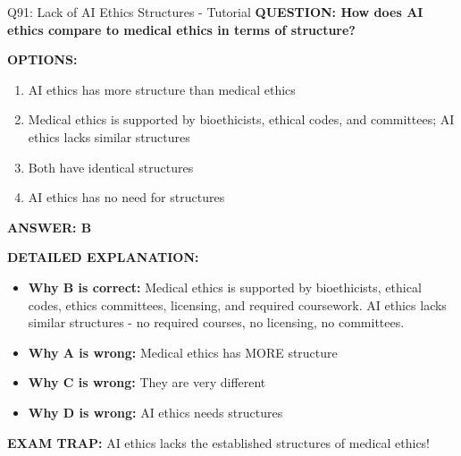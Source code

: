 \documentclass[8pt]{beamer}
\begin{document}
	\begin{frame}{Q91: Lack of AI Ethics Structures - Tutorial}
		\fontsize{6.5}{7.5}\selectfont
		\textbf{QUESTION: How does AI ethics compare to medical ethics in terms of structure?}
		
		\vspace{0.1cm}
		\textbf{OPTIONS:}
		\begin{enumerate}
			\item AI ethics has more structure than medical ethics
			\item Medical ethics is supported by bioethicists, ethical codes, and committees; AI ethics lacks similar structures
			\item Both have identical structures
			\item AI ethics has no need for structures
		\end{enumerate}
		
		\vspace{0.1cm}
		\textcolor{myblue}{\textbf{ANSWER: B}}
		
		\vspace{0.1cm}
		\textbf{DETAILED EXPLANATION:}
		\begin{itemize}
			\item \textbf{Why B is correct:} Medical ethics is supported by bioethicists, ethical codes, ethics committees, licensing, and required coursework. AI ethics lacks similar structures - no required courses, no licensing, no committees.
			\item \textbf{Why A is wrong:} Medical ethics has MORE structure
			\item \textbf{Why C is wrong:} They are very different
			\item \textbf{Why D is wrong:} AI ethics needs structures
		\end{itemize}
		
		\textcolor{myred}{\textbf{EXAM TRAP:}} AI ethics lacks the \textcolor{myblue}{established structures} of medical ethics!
	\end{frame}
	
\end{document}
